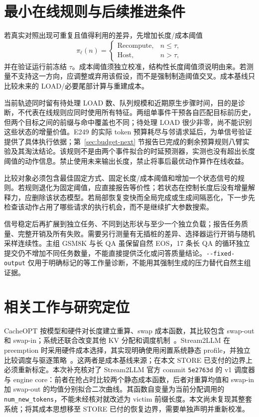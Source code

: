 \documentclass[UTF8,fontset=fandol,a4paper,10pt]{ctexart}
\newcommand{\code}[1]{\nolinkurl{#1}}
\begin{document}
\section{最小在线规则与后续推进条件}
\label{sec:future-rule}
若真实对照出现可重复且值得利用的差异，先增加长度/成本阈值
\begin{equation}
 \pi_{\ell}(n)=
 \begin{cases}\mathrm{Recompute},&n\le\tau,\\
 \mathrm{Host},&n>\tau,
 \end{cases}
\end{equation}
并在验证运行前冻结 $\tau$。成本阈值须独立校准，结构性长度阈值须说明由来。若测量不支持这一方向，应调整或弃用该假设，而不是强制制造阈值交叉。成本基线只比较未来的 LOAD/必要尾部计算与重建成本。

当前轨迹同时留有待处理 LOAD 数、队列规模和近期原生步骤时间，目的是诊断，不代表在线规则应同时使用所有特征。两组单事件干预各自匹配目标前历史，但两个目标之间的前缀与命中覆盖也不同；待处理 LOAD 很少非零，尚不能识别这些状态的增量价值。E249 的实际 token 预算耗尽与邻请求延后，为单信号验证提供了具体执行依据；第~\ref{sec:budget-next} 节报告已完成的剩余预算规则八臂实验及其淘汰结论。该规则不是由两个事件拟合的时延预测器，实测也没有超出长度阈值的动作信息。禁止使用未来输出长度，禁止将事后最优动作算作在线收益。

比较对象必须包含最佳固定方式、固定长度/成本阈值和增加一个状态信号的规则。若规则退化为固定阈值，应直接报告等价性；若状态在控制长度后没有增量解释力，应删除该状态模型。若局部恢复变快而全局完成或生成间隔恶化，下一步先检查该动作占用了哪些请求的执行机会，而不是继续扩大参数搜索。

信号稳定后再扩展到独立任务、不同到达形状与至少一个独立负载；报告任务质量、完整开销及所有失败。需要另行测量有无插桩的差异、选择器运行开销与随机采样连续性。主组 GSM8K 与长 QA 虽保留自然 EOS，17 条长 QA 的循环独立提交仍不增加不同任务数量，不能直接提供泛化或问答质量结论。\code{--fixed-output} 仅用于明确标记的等工作量诊断，不能用其强制生成的压力替代自然主组证据。

\section{相关工作与研究定位}
CacheOPT 按模型和硬件对长度建立重算、swap 成本函数，其比较包含 swap-out 和 swap-in；系统还联合改变其他 KV 分配和调度机制~\cite{cacheopt}。Stream2LLM 在 preemption 时采用硬件成本选择，其实现明确使用闲置系统静态 profile，并独立比较调度与驱逐策略~\cite{stream2llm}。这两者是成本基线来源；在本文 STORE 已支付的边界上必须重新标定。本次补充核对了 Stream2LLM 官方 commit \code{5e2763d} 的 v1 调度器与 engine core：前者在抢占时比较两个静态成本函数，后者对重算均值和 swap-in 加 swap-out 的均值分别拟合二次曲线。其函数自变量为当前分配调用的 \code{num_new_tokens}，不能未经核对就改述为 victim 前缀长度。本文尚未复现其整套系统；将其成本思想移至 STORE 已付的恢复边界，需要单独声明并重新校准。
\end{document}
